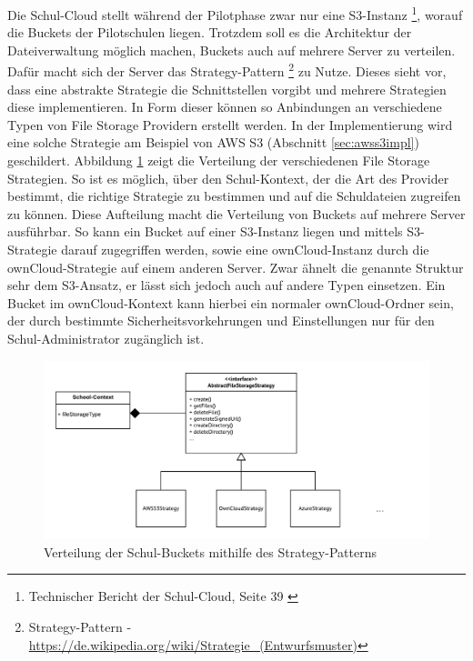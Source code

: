 Die Schul-Cloud stellt während der Pilotphase zwar nur eine S3-Instanz \footnote{Technischer Bericht der Schul-Cloud, Seite 39 \cite{paper:technischerbericht}}, worauf die Buckets der Pilotschulen liegen. Trotzdem soll es die Architektur der Dateiverwaltung möglich machen, Buckets auch auf mehrere Server zu verteilen. Dafür macht sich der Server das Strategy-Pattern \footnote{Strategy-Pattern - \url{https://de.wikipedia.org/wiki/Strategie_(Entwurfsmuster)}} zu Nutze. Dieses sieht vor, dass eine abstrakte Strategie die Schnittstellen vorgibt und mehrere Strategien diese implementieren. In Form dieser können so Anbindungen an verschiedene Typen von File Storage Providern erstellt werden. In der Implementierung wird eine solche Strategie am Beispiel von AWS S3 (Abschnitt \ref{sec:awss3impl}) geschildert. Abbildung \ref{fig:strategy} zeigt die Verteilung der verschiedenen File Storage Strategien. So ist es möglich, über den Schul-Kontext, der die Art des Provider bestimmt, die richtige Strategie zu bestimmen und auf die Schuldateien zugreifen zu können. Diese Aufteilung macht die Verteilung von Buckets auf mehrere Server ausführbar. So kann ein Bucket auf einer S3-Instanz liegen und mittels S3-Strategie darauf zugegriffen werden, sowie eine ownCloud-Instanz durch die ownCloud-Strategie auf einem anderen Server. Zwar ähnelt die genannte Struktur sehr dem S3-Ansatz, er lässt sich jedoch auch auf andere Typen einsetzen. Ein Bucket im ownCloud-Kontext kann hierbei ein normaler ownCloud-Ordner sein, der durch bestimmte Sicherheitsvorkehrungen und Einstellungen nur für den Schul-Administrator zugänglich ist.

\begin{figure}[H]
	\centering
	\includegraphics[width=1\linewidth]{images/strategypattern}
	\caption[Caption for concept]{Verteilung der Schul-Buckets mithilfe des Strategy-Patterns}
	\label{fig:strategy}
\end{figure}

